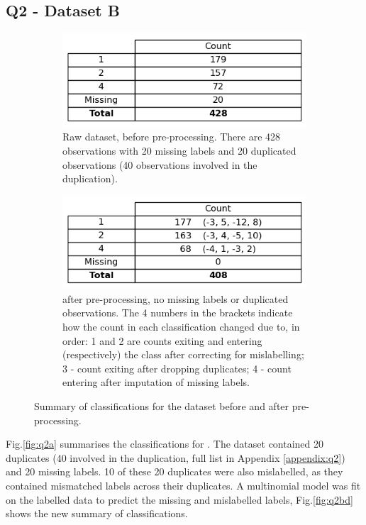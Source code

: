 
\subsection{Q2 - Dataset B}\label{subsec:dataset-b}
    \begin{figure}
    \centering
    \begin{subfigure}{0.9\textwidth}
      \centering
      \includegraphics[width=.55\linewidth]{./figures/q2a}
      \caption{Raw  dataset, before pre-processing. There are 428 observations with 20 missing
        labels and 20 duplicated observations (40 observations involved in the duplication).}
      \label{fig:q2a}
    \end{subfigure}%
    \hfill
    \begin{subfigure}{0.9\textwidth}
      \centering
      \includegraphics[width=0.55\linewidth]{./figures/q2b_q2d}
      \caption{ after pre-processing, no missing labels or duplicated observations.
        The 4 numbers in the brackets indicate how the count in each classification changed due to, in order: 1 and 2
        are counts exiting and entering (respectively) the class after correcting for mislabelling; 3 -
        count exiting after dropping duplicates; 4 - count entering after imputation of missing labels.}
      \label{fig:q2bd}
    \end{subfigure}
    \caption{Summary of classifications for the  dataset before and after pre-processing.}
    \label{fig:q2abd}
    \end{figure}

    Fig.\eqref{fig:q2a} summarises the classifications for .
    The dataset contained 20 duplicates (40 involved in the duplication, full list in Appendix \ref{appendix:q2}) and
    20 missing labels.
    10 of these 20 duplicates were also mislabelled, as they contained mismatched labels across their duplicates.
    A multinomial  model was fit on the labelled data to predict the missing and mislabelled
    labels, Fig.\eqref{fig:q2bd} shows the new summary of classifications.

